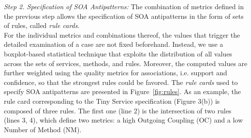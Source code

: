 \vspace{0.10cm}

\noindent \emph{Step 2. Specification of SOA Antipatterns:} The combination of metrics defined in the previous step allows the specification of SOA antipatterns in the form of sets of rules, called \textit{rule cards}.
\vspace{0.15cm}
\\
\noindent For the individual
metrics and combinations thereof, the values that trigger the detailed
examination of a case are not fixed beforehand. Instead, we use a
boxplot-based statistical technique that exploits the distribution
of all values across the sets of services, methods, and rules. Moreover,
the computed values are further weighted using the quality metrics
for associations, i.e. support and confidence, so that the strongest
rules could be favored. The \textit{rule cards} used to specify SOA  antipatterns are presented in Figure~\ref{fig:rules}. As an example, the rule card corresponding to the Tiny Service specification (Figure 3(b)) is composed of three rules. The first one (line 2) is the intersection of two rules (lines 3, 4), which define two metrics: a high Outgoing Coupling (OC) and a low Number of Method (NM).


